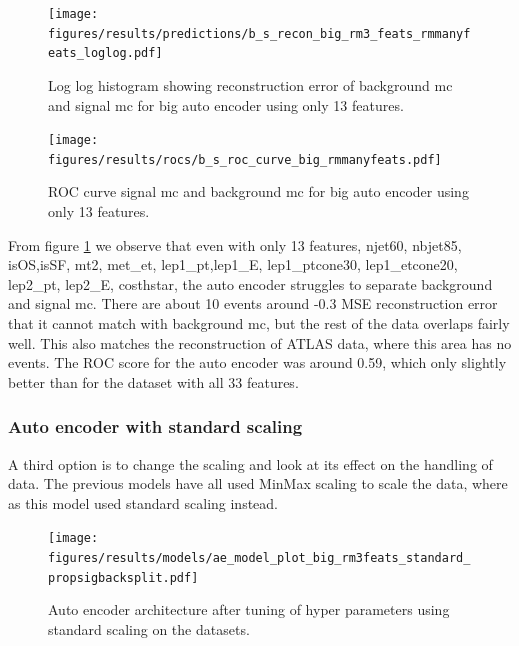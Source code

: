 \documentclass[ reprint, amsmath,amssymb, aps, nofootinbib]{revtex4-2}
\begin{document}
\begin{figure}[H]
    \centering
    \texttt{[image: figures/results/predictions/b\_s\_recon\_big\_rm3\_feats\_rmmanyfeats\_loglog.pdf]}
    \caption{Log log histogram showing reconstruction error of background mc and signal mc for big auto encoder using only 13 features. }
    \label{fig:roc_sig_big_13feats}
\end{figure}

\begin{figure}[H]
    \centering
         \texttt{[image: figures/results/rocs/b\_s\_roc\_curve\_big\_rmmanyfeats.pdf]}
         \caption{ROC curve signal mc and background mc for big auto encoder using only 13 features.}
         \label{fig:s_b_big_roc_13}
\end{figure}



From figure \ref{fig:roc_sig_big_13feats} we observe that even with only 13 features, 
njet60,  nbjet85, isOS,isSF,  mt2, met\_et, lep1\_pt,lep1\_E, lep1\_ptcone30, lep1\_etcone20, lep2\_pt,  lep2\_E, costhstar, the auto encoder struggles to separate background and signal mc. There are about 10 events around -0.3 MSE reconstruction error that it cannot match with background mc, but the rest of the data overlaps fairly well. This also matches the reconstruction of ATLAS data, where this area has no events. The ROC score for the auto encoder was around 0.59, which only slightly better than for the dataset with all 33 features. \par

\subsubsection{Auto encoder with standard scaling}

A third option is to change the scaling and look at its effect on the handling of data. The previous models have all used MinMax scaling to scale the data, where as this model used standard scaling instead. 


\begin{figure}[H]
     \centering
         \texttt{[image: figures/results/models/ae\_model\_plot\_big\_rm3feats\_standard\_propsigbacksplit.pdf]}
         \caption{Auto encoder architecture after tuning of hyper parameters using standard scaling on the datasets. }
     \label{fig:ae_big_standard}
\end{figure}
\end{document}
